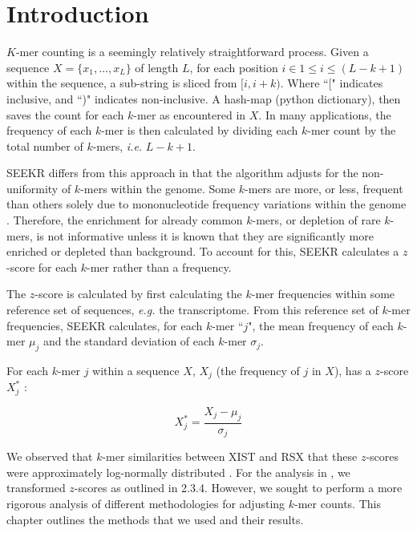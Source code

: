 \section{Introduction}
$K$-mer counting is a seemingly relatively straightforward process. Given a sequence $X = \{x_1,\dots,x_L\}$ of length $L$, for each position $i\in 1\leq i\leq \left(L-k+1\right)$ within the sequence, a sub-string is sliced from $[i,i+k)$. Where ``[" indicates inclusive, and ``)" indicates non-inclusive. A hash-map (python dictionary), then saves the count for each $k$-mer as encountered in $X$. In many applications, the frequency of each $k$-mer is then calculated by dividing each $k$-mer count by the total number of $k$-mers, \emph{i.e.} $L-k+1$. 

SEEKR differs from this approach in that the algorithm adjusts for the non-uniformity of $k$-mers within the genome. Some $k$-mers are more, or less, frequent than others solely due to mononucleotide frequency variations within the genome \cite{Haubold2014Alignment-freeGenetics,Yang2008PerformanceReconstruction}. Therefore, the enrichment for already common $k$-mers, or depletion of rare $k$-mers, is not informative unless it is known that they are significantly more enriched or depleted than background. To account for this, SEEKR calculates a $z$-score for each $k$-mer rather than a frequency.

The $z$-score is calculated by first calculating the $k$-mer frequencies within some reference set of sequences, \emph{e.g.} the transcriptome. From this reference set of $k$-mer frequencies, SEEKR calculates, for each $k$-mer ``$j$", the mean frequency of each $k$-mer $\mu_j$ and the standard deviation of each $k$-mer $\sigma_j$. 

For each $k$-mer $j$ within a sequence $X$, $X_j$ (the frequency of $j$ in $X$), has a $z$-score $X^*_j$ \cite{Kirk2018FunctionalContent}: 

\begin{equation}
    X_j^* = \frac{X_j-\mu_j}{\sigma_j}
    \label{eq:zscore}
\end{equation}

We observed that $k$-mer similarities between XIST and RSX that these $z$-scores were approximately log-normally distributed \cite{Sprague2019NonlinearDomains}. For the analysis in \cite{Sprague2019NonlinearDomains}, we transformed $z$-scores as outlined in 2.3.4. However, we sought to perform a more rigorous analysis of different methodologies for adjusting $k$-mer counts. This chapter outlines the methods that we used and their results. 

